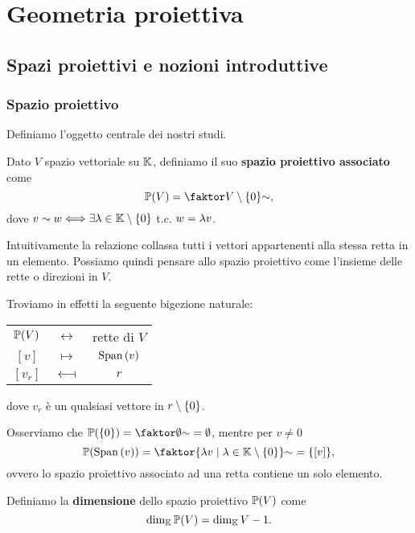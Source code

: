 \chapter{Geometria proiettiva}
\setlength{\parindent}{2pt}

\begin{multicols*}{2}
    \section{Spazi proiettivi e nozioni introduttive}
    \subsection{Spazio proiettivo}
    Definiamo l'oggetto centrale dei nostri studi.
    \begin{definition}
    Dato $V$ spazio vettoriale su $\mathbb{K}$, definiamo il suo \textbf{spazio proiettivo associato} come
    \[\PV=\quot{V\nz}{\sim},\]
    dove $v\sim w\Longleftrightarrow \exists \lambda\in\mathbb{K}\setminus\{0\}$ t.c. $w=\lambda v$.
    \end{definition}
    \noindent
    Intuitivamente la relazione collassa tutti i vettori appartenenti alla stessa retta in un elemento. Possiamo quindi pensare allo spazio proiettivo come l'insieme delle rette o direzioni in $V$.

    Troviamo in effetti la seguente bigezione naturale:
    \begin{center}
    \begin{tabular}{ccc}
        ${\mathbb{P}(V)}$ & $\longleftrightarrow$ & rette di $V$ \\
        $[v]$ & $\longmapsto$ & $\mathrm{Span}\,(v)$\\
        $[v_r]$ & $\longmapsfrom$ & $r$
    \end{tabular}
    \end{center}
    dove $v_r$ \`e un qualsiasi vettore in $r\setminus\{0\}$.

    \begin{example}
    Osserviamo che $\Pj(\{0\})=\quot{\emptyset}{\sim}=\emptyset$, mentre per $v\neq0$
    \[\Pj(\Span(v))=\quot{\{\la v\mid \la\in\K\nz\}}{\sim}=\{[v]\},\]
    ovvero lo spazio proiettivo associato ad una retta contiene un solo elemento.
    \end{example}

    \begin{definition}
        Definiamo la \textbf{dimensione} dello spazio proiettivo ${\mathbb{P}(V)}$ come
        \[\dim_{\mathbb{K}}{\mathbb{P}(V)}=\dim_{\mathbb{K}} V -1.\]
    \end{definition}


\end{multicols*}

